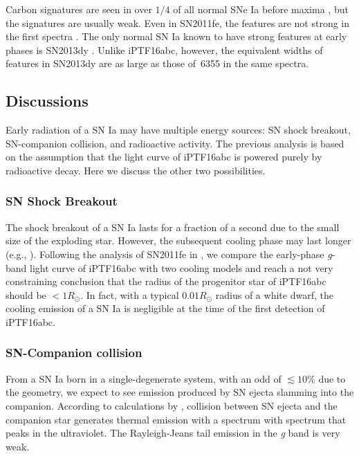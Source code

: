 \documentclass[twocolumn]{aastex61}
\newcommand{\sr}{R_\odot}
\begin{document}
Carbon signatures are seen in over $1/4$ of all normal SNe Ia before
maxima
\citep{2011ApJ...732...30P,2012MNRAS.425.1917S,2011ApJ...743...27T},
but the signatures are usually weak. Even in SN2011fe, the 
features are not strong in the first spectra
\citep{2012ApJ...752L..26P}.  The only normal SN Ia known to have
strong  features at early phases is SN2013dy
\citep{2013ApJ...778L..15Z}. Unlike iPTF16abc, however, the equivalent
widths of  features in SN2013dy are as large as those of
\,6355 in the same spectra.


\subsection{Discussions}
\label{sec:lc_energy}

Early radiation of a SN Ia may have multiple energy sources: SN shock
breakout, SN-companion collision, and radioactive activity. The
previous analysis is based on the assumption that the light curve of
iPTF16abc is powered purely by radioactive decay. Here we discuss the
other two possibilities.

\subsubsection{SN Shock Breakout}

The shock breakout of a SN Ia lasts for a fraction of a second due to
the small size of the exploding star. However, the subsequent cooling
phase may last longer (e.g., \citealt{2010ApJ...708..598P}).
Following the analysis of SN2011fe in \citet{2012ApJ...744L..17B}, we
compare the early-phase \textit{g}-band light curve of iPTF16abc with
two cooling models \citep{2011ApJ...728...63R, 2010ApJ...708..598P}
and reach a not very constraining conclusion that the radius of the
progenitor star of iPTF16abc should be $<1\sr$. In fact, with a
typical $0.01\sr$ radius of a white dwarf, the cooling emission of a
SN Ia is negligible at the time of the first detection of iPTF16abc.

\subsubsection{SN-Companion collision}

From a SN Ia born in a single-degenerate system, with an odd of
$\lesssim10\%$ due to the geometry, we expect to see emission produced
by SN ejecta slamming into the companion. According to calculations by
\citet{2010ApJ...708.1025K}, collision between SN ejecta and the
companion star generates thermal emission with a spectrum with
spectrum that peaks in the ultraviolet. The Rayleigh-Jeans tail
emission in the \textit{g} band is very weak.
\end{document}
